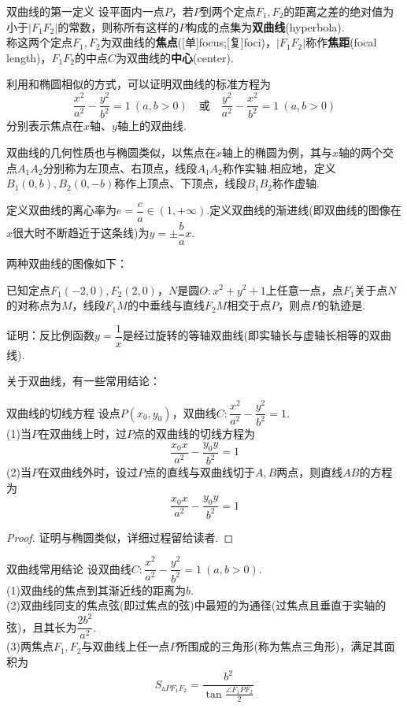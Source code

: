 \documentclass[lang=cn, zihao=5]{elegantbook}
\newcommand{\tk}{\uline{\hspace{4em}}}
\begin{document}
\begin{definition}{双曲线的第一定义}
	设平面内一点$P$，若$P$到两个定点$F_1,F_2$的距离之差的绝对值为小于$|F_1F_2|$的常数，则称所有这样的$P$构成的点集为\textbf{双曲线}(hyperbola). \\
	称这两个定点$F_1,F_2$为双曲线的\textbf{焦点}([单]focus;[复]foci)，$|F_1F_2|$称作\textbf{焦距}(focal length)，$F_1F_2$的中点$C$为双曲线的\textbf{中心}(center).
\end{definition}

利用和椭圆相似的方式，可以证明双曲线的标准方程为$$\frac{x^2}{a^2}-\frac{y^2}{b^2}=1~(a,b>0) \quad \textit{或} \quad \frac{y^2}{a^2}-\frac{x^2}{b^2}=1~(a,b>0)$$
分别表示焦点在$x$轴、$y$轴上的双曲线.

双曲线的几何性质也与椭圆类似，以焦点在$x$轴上的椭圆为例，其与$x$轴的两个交点$A_1A_2$分别称为左顶点、右顶点，线段$A_1A_2$称作实轴.相应地，定义$B_1(0,b),B_2(0,-b)$称作上顶点、下顶点，线段$B_1B_2$称作虚轴.

定义双曲线的离心率为$e=\dfrac{c}{a} \in (1,+\infty)$.定义双曲线的渐进线(即双曲线的图像在$x$很大时不断趋近于这条线)为$y=\pm \dfrac{b}{a} x$.

两种双曲线的图像如下：


\begin{example}
	已知定点$F_1(-2,0),F_2(2,0)$，$N$是圆$O:x^2+y^2+1$上任意一点，点$F_1$关于点$N$的对称点为$M$，线段$F_1M$的中垂线与直线$F_2M$相交于点$P$，则点$P$的轨迹是\tk .
\end{example}

\begin{example}
	证明：反比例函数$y=\dfrac{1}{x}$是经过旋转的等轴双曲线(即实轴长与虚轴长相等的双曲线).
\end{example}

关于双曲线，有一些常用结论：

\begin{proposition}{双曲线的切线方程}
	设点$P(x_0,y_0)$，双曲线$C:\dfrac{x^2}{a^2}-\dfrac{y^2}{b^2}=1$. \\
	(1)当$P$在双曲线上时，过$P$点的双曲线的切线方程为$$\frac{x_0x}{a^2} - \frac{y_0y}{b^2} = 1$$
	(2)当$P$在双曲线外时，设过$P$点的直线与双曲线切于$A,B$两点，则直线$AB$的方程为$$\frac{x_0x}{a^2} - \frac{y_0y}{b^2} = 1$$
\end{proposition}
\begin{proof}
	证明与椭圆类似，详细过程留给读者.
\end{proof}

\begin{proposition}{双曲线常用结论}
	设双曲线$C:\dfrac{x^2}{a^2}-\dfrac{y^2}{b^2}=1~(a,b>0)$. \\
	(1)双曲线的焦点到其渐近线的距离为$b$. \\
	(2)双曲线同支的焦点弦(即过焦点的弦)中最短的为通径(过焦点且垂直于实轴的弦)，且其长为$\dfrac{2b^2}{a^2}$. \\
	(3)两焦点$F_1,F_2$与双曲线上任一点$P$所围成的三角形(称为焦点三角形)，满足其面积为$$S_{\vartriangle PF_1F_2} = \frac{b^2}{\tan \frac{\angle F_1PF_2}{2}}$$
\end{proposition}
\end{document}

